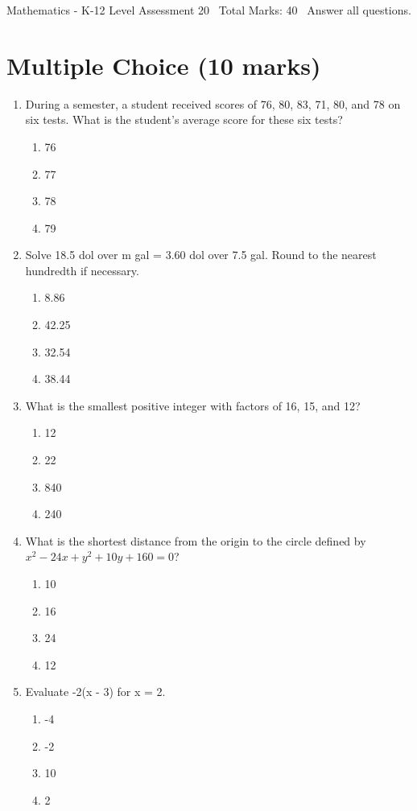 \documentclass[12pt]{article}
\begin{document}
\begin{center}
Mathematics - K-12 Level Assessment 20 \
Total Marks: 40 \
Answer all questions.
\end{center}

\section*{Multiple Choice (10 marks)}
\begin{enumerate}[label=\arabic*.]
\item During a semester, a student received scores of 76, 80, 83, 71, 80, and 78 on six tests. What is the student's average score for these six tests?
\begin{enumerate}[label=(\alph*)]
    \item 76
    \item 77
    \item 78
    \item 79
\end{enumerate}
\item Solve 18.5 dol over m gal = 3.60 dol over 7.5 gal. Round to the nearest hundredth if necessary.
\begin{enumerate}[label=(\alph*)]
    \item 8.86
    \item 42.25
    \item 32.54
    \item 38.44
\end{enumerate}
\item What is the smallest positive integer with factors of 16, 15, and 12?
\begin{enumerate}[label=(\alph*)]
    \item 12
    \item 22
    \item 840
    \item 240
\end{enumerate}
\item What is the shortest distance from the origin to the circle defined by $x^2-24 x +y^2+10 y +160=0$?
\begin{enumerate}[label=(\alph*)]
    \item 10
    \item 16
    \item 24
    \item 12
\end{enumerate}
\item Evaluate -2(x - 3) for x = 2.
\begin{enumerate}[label=(\alph*)]
    \item -4
    \item -2
    \item 10
    \item 2
\end{enumerate}
\end{enumerate}
\end{document}
